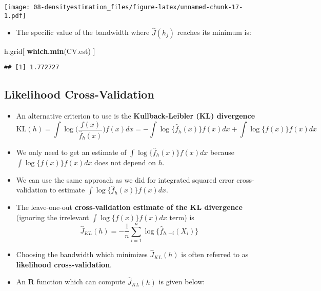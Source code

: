 \documentclass[]{book}
\newenvironment{Shaded}{\begin{snugshade}}{\end{snugshade}}
\newcommand{\KeywordTok}[1]{\textcolor[rgb]{0.13,0.29,0.53}{\textbf{#1}}}
\newcommand{\NormalTok}[1]{#1}
\providecommand{\tightlist}{%
  \setlength{\itemsep}{0pt}\setlength{\parskip}{0pt}}
\begin{document}
\texttt{[image: 08-densityestimation\_files/figure-latex/unnamed-chunk-17-1.pdf]}

\begin{itemize}
\tightlist
\item
  The specific value of the bandwidth where \(\hat{J}(h_{j})\) reaches its minimum is:
\end{itemize}

\begin{Shaded}
\begin{Highlighting}[]
\NormalTok{h.grid[ }\KeywordTok{which.min}\NormalTok{(CV.est) ]}
\end{Highlighting}
\end{Shaded}

\begin{verbatim}
## [1] 1.772727
\end{verbatim}

\hypertarget{likelihood-cross-validation}{%
\subsection{Likelihood Cross-Validation}\label{likelihood-cross-validation}}

\begin{itemize}
\item
  An alternative criterion to use is the \textbf{Kullback-Leibler (KL) divergence}
  \begin{equation}
  \textrm{KL}(h) = \int \log \Big( \frac{ f(x) }{ \hat{f}_{h}(x) } \Big)  f(x) dx
  = -\int \log \{ \hat{f}_{h}(x) \}  f(x) dx + \int \log\{ f(x) \}f(x) dx
  \end{equation}
\item
  We only need to get an estimate of \(\int \log \{ \hat{f}_{h}(x) \} f(x) dx\)
  because \(\int \log\{ f(x) \}f(x) dx\) does not depend on \(h\).
\item
  We can use the same approach as we did for integrated squared error cross-validation
  to estimate \(\int \log \{ \hat{f}_{h}(x) \} f(x) dx\).
\item
  The leave-one-out \textbf{cross-validation estimate of the KL divergence} (ignoring the irrelevant \(\int \log\{ f(x) \}f(x) dx\) term) is
  \begin{equation}
  \hat{J}_{KL}(h) = -\frac{1}{n} \sum_{i=1}^{n} \log \{ \hat{f}_{h, -i}( X_{i} ) \}  \nonumber
  \end{equation}
\item
  Choosing the bandwidth which minimizes \(\hat{J}_{KL}(h)\) is often referred to as \textbf{likelihood cross-validation}.
\item
  An \textbf{R} function which can compute \(\hat{J}_{KL}(h)\) is given below:
\end{itemize}
\end{document}
